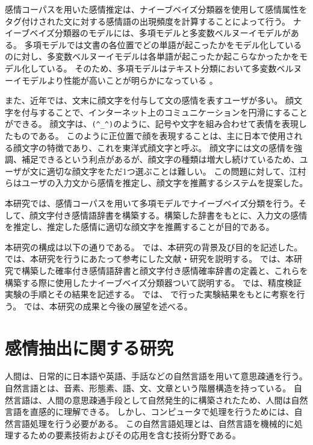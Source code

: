 \documentclass[11pt,a4j]{jsarticle}
\begin{document}
感情コーパスを用いた感情推定は、ナイーブベイズ分類器を使用して感情属性をタグ付けされた文に対する感情語の出現頻度を計算することによって行う。
ナイーブベイズ分類器のモデルには、多項モデルと多変数ベルヌーイモデルがある。
多項モデルでは文書の各位置でどの単語が起こったかをモデル化しているのに対し、多変数ベルヌーイモデルは各単語が起こったか起こらなかったかをモデル化している。
そのため、多項モデルはテキスト分類において多変数ベルヌーイモデルより性能が高いことが明らかになっている 。

また、近年では、文末に顔文字を付与して文の感情を表すユーザが多い。
顔文字を付与することで、インターネット上のコミュニケーションを円滑にすることができる。
顔文字は、\verb|(^_^)|のように、記号や文字を組み合わせて表情を表現したものである。
このように正位置で顔を表現することは、主に日本で使用される顔文字の特徴であり、これを東洋式顔文字と呼ぶ。
顔文字には文の感情を強調、補足できるという利点があるが、顔文字の種類は増大し続けているため、ユーザが文に適切な顔文字をただ1つ選ぶことは難しい。
この問題に対して、江村らはユーザの入力文から感情を推定し、顔文字を推薦するシステムを提案した。


本研究では、感情コーパスを用いて多項モデルでナイーブベイズ分類を行う。そして、顔文字付き感情語辞書を構築する。構築した辞書をもとに、入力文の感情を推定し、推定した感情に適切な顔文字を推薦することが目的である。

本研究の構成は以下の通りである。
 では、本研究の背景及び目的を記述した。 では、本研究を行うにあたって参考にした文献・研究を説明する。
 では、本研究で構築した確率付き感情語辞書と顔文字付き感情確率辞書の定義と、これらを構築する際に使用したナイーブベイズ分類器ついて説明する。
では、精度検証実験の手順とその結果を記述する。
では、 で行った実験結果をもとに考察を行う。
では、本研究の成果と今後の展望を述べる。

\section{感情抽出に関する研究}\label{sec:relatedworks}
人間は、日常的に日本語や英語、手話などの自然言語を用いて意思疎通を行う。
自然言語とは、音素、形態素、語、文、文章という階層構造を持っている。
自然言語は、人間の意思疎通手段として自然発生的に構築されたため、人間は自然言語を直感的に理解できる。
しかし、コンピュータで処理を行うためには、自然言語処理を行う必要がある。
この自然言語処理とは、自然言語を機械的に処理するための要素技術およびその応用を含む技術分野である。
\end{document}
